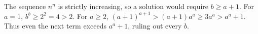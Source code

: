 The sequence $n^n$ is strictly increasing, so a solution would require $b\ge a+1$. For $a=1$, $b^b\ge2^2=4>2$. For $a\ge2$, $(a+1)^{a+1}>(a+1)a^a\ge3a^a>a^a+1$. Thus even the next term exceeds $a^a+1$, ruling out every $b$.
